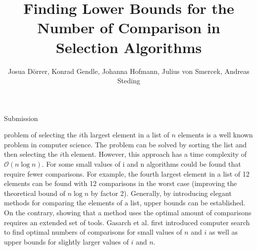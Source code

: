 \documentclass[10pt,journal,compsoc]{IEEEtran}
\begin{document}
\title{Finding Lower Bounds for the Number of Comparison in Selection Algorithms}

\author{Josua Dörrer, Konrad Gendle, Johanna Hofmann, Julius von Smercek, Andreas Steding%
  }

%
{Submission}



\maketitle

\IEEEdisplaynontitleabstractindextext


\IEEEpeerreviewmaketitle


 problem of selecting the $i$th largest element in a list of $n$ elements is a well known problem in computer science. The problem can be solved by sorting the list and then selecting the $i$th element. However, this approach has a time complexity of $\mathcal{O}(n \log n)$. For some small values of i and n algorithms could be found that require fewer comparisons. For example, the fourth largest element in a list of 12 elements can be found with 12 comparisons in the worst case (improving the theoretical bound of $n \log n$ by factor 2). \cite[p. 212]{Knuth1973} Generally, by introducing elegant methods for comparing the elements of a list, upper bounds can be established. On the contrary, showing that a method uses the optimal amount of comparisons requires an extended set of tools. Gasarch et al. \cite{Gasarch1996} first introduced computer search to find optimal numbers of comparisons for small values of $n$ and $i$ as well as upper bounds for slightly larger values of $i$ and $n$.
\end{document}
